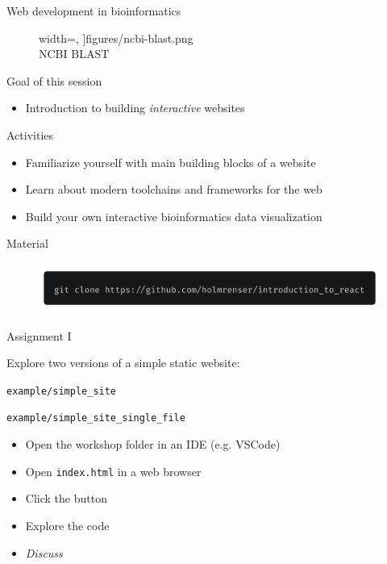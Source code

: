 \documentclass[10pt]{beamer}
\begin{document}
\begin{frame}{Web development in bioinformatics}
\begin{figure}
\begin{minipage}{.3\linewidth}
                width=\linewidth,
            ]{figures/ncbi-blast.png}
            \\ \tiny{NCBI BLAST}
        \end{minipage}
    \end{figure}
\end{frame}

\begin{frame}

    {\huge Goal of this session}
    \begin{itemize}
        \item Introduction to building \textit{interactive} websites
    \end{itemize}
    \vspace{2em}
    {\large Activities}
    \begin{itemize}
        \item Familiarize yourself with main building blocks of a website
        \item Learn about modern toolchains and frameworks for the web
        \item Build your own interactive bioinformatics data visualization
    \end{itemize}
    \vspace{1em}
    {\large Material}
    \begin{figure}
        \includegraphics[width=.99\linewidth]{figures/material-link.png}
    \end{figure}
\end{frame}

\begin{frame}

    {\huge Assignment I}

    \vspace{1em}
    Explore two versions of a simple static website:

    \vspace{.5em}

    \texttt{example/simple\_site}

    \texttt{example/simple\_site\_single\_file}


    \vspace{2em}
    \begin{itemize}
        \item Open the workshop folder in an IDE (e.g. VSCode)
        \item Open \texttt{index.html} in a web browser
        \item Click the button
        \item Explore the code
        \item \textit{Discuss}
    \end{itemize}
\end{frame}
\end{document}
